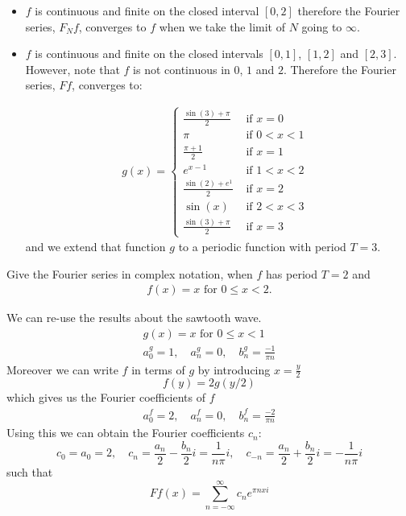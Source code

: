 \documentclass[11pt]{article}
\begin{document}
\begin{solution}     
\begin{itemize}
\item $f$ is continuous and finite on the closed interval $[0,2]$ therefore the Fourier series, $F_N f$, converges to $f$ when we take the limit of $N$ going to $\infty$.
\item $f$ is continuous and finite on the closed intervals $[0,1]$, $[1,2]$ and $[2,3]$. 
However, note that $f$ is not continuous in $0$, $1$ and $2$.
Therefore the Fourier series, $F f$, converges to: 

\begin{gather*}
            g(x) = \left\{\begin{array}{ll}
                            \frac{\sin(3) + \pi}{2} & \text{ if $x = 0$ }
						\\
                            \pi   & \text{ if $0 < x < 1$ }
                            \\
                            \frac{\pi + 1}{2} & \text{ if $x = 1$ }
						\\
                            e^{x-1} & \text{ if $1 < x < 2$ }
						\\
                            \frac{\sin(2) + e^1}{2} & \text{ if $x = 2$ }
						\\
                            \sin(x) & \text{ if $2 < x < 3$ }
						\\
                            \frac{\sin(3) + \pi}{2} & \text{ if $x = 3$ }
                          \end{array}\right.
\end{gather*}
and we extend that function $g$ to a periodic function with period $T = 3$. 
\end{itemize}
\end{solution}

\begin{exercise}
    Give the Fourier series in complex notation, when $f$ has period $T = 2$ and 
    \begin{gather*}
        f(x) = x \text{ for } 0 \leq x < 2.
    \end{gather*}
\end{exercise}
\begin{solution}     
We can re-use the results about the sawtooth wave.
\begin{gather*}
    g(x)=x \text { for } 0 \leq x<1
    \\
    a_0^g = 1,\quad a_n^g = 0, \quad b_n^g = \frac{-1}{\pi n}
\end{gather*}
Moreover we can write $f$ in terms of $g$ by introducing $x = \frac{y}{2}$
\[
    f(y) = 2g(y/2)
\]
which gives us the Fourier coefficients of $f$
\begin{gather*}
    a_0^f = 2,\quad a_n^f = 0, \quad b_n^f = \frac{-2}{\pi n}
\end{gather*}
Using this we can obtain the Fourier coefficients $c_n$:
\[
    c_0 = a_0 = 2,\quad c_n=\frac{a_n}{2}-\frac{b_n}{2} i = \frac{1}{n\pi}i, \quad c_{-n}=\frac{a_n}{2}+\frac{b_n}{2} i = -\frac{1}{n\pi}i
\]
such that 
\[
    F f(x)=\sum_{n=-\infty}^{\infty} c_n e^{\pi n x i}
\]
\end{solution}
\end{document}
